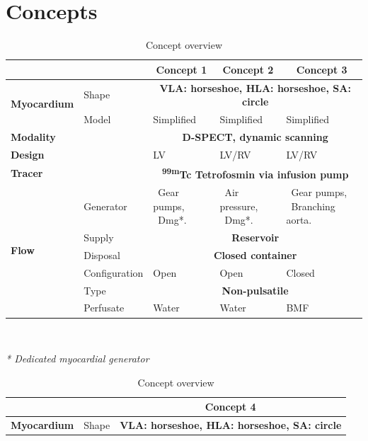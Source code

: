 \section{Concepts}
\begin{table}[H]
\caption{Concept overview}
\raggedright
\begin{tabular}{ll|lll|}
										& 				& \multicolumn{1}{c}{Concept 1} & \multicolumn{1}{c}{Concept 2} &\multicolumn{1}{c}{Concept 3}\\ \hline
	\multirow{2}{*}{\textbf{Myocardium}}& Shape	 			& \multicolumn{3}{c|}{\textbf{VLA: horseshoe, HLA: horseshoe, SA: circle}} \\
										& Model 			& Simplified & Simplified & Simplified\\
	\textbf{Modality}					&					& \multicolumn{3}{c|}{\textbf{D-SPECT, dynamic scanning}} \\
	\textbf{Design}						& 					& LV & LV/RV & LV/RV \\
	\textbf{Tracer}						&					& \multicolumn{3}{c|}{\textbf{\textsuperscript{99m}Tc Tetrofosmin via infusion pump}} \\
	\multirow{6}{*}{\textbf{Flow}}		& Generator 		& \makecell[l]{\textbullet\ Gear pumps, \\ \textbullet\  Dmg*.} & \makecell[l]{\textbullet\ Air pressure, \\ \textbullet\ Dmg*.} & \makecell[l]{\textbullet\ Gear pumps, \\ \textbullet\ Branching aorta.}\\
										& Supply			& \multicolumn{3}{c|}{\textbf{Reservoir}} \\
										& Disposal			& \multicolumn{3}{c|}{\textbf{Closed container}} \\
										& Configuration 	& Open & Open & Closed\\
										& Type				& \multicolumn{3}{c|}{\textbf{Non-pulsatile}}  \\
										& Perfusate			& Water & Water & BMF\\ \cline{3-5}
\end{tabular} \\
\raggedright
\textit{* Dedicated myocardial generator} \\
\vspace{1cm}
\begin{tabular}{ll|l|}
										& 					& \multicolumn{1}{c}{Concept 4} \\ \hline
	\multirow{2}{*}{\textbf{Myocardium}}& Shape	 			& \multicolumn{1}{c|}{\textbf{VLA: horseshoe, HLA: horseshoe, SA: circle}} \\

\end{tabular}
\end{table}
